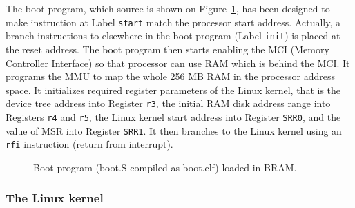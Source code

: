 The boot program, which source is shown on Figure~\ref{fig:boot}, has been designed to make instruction at Label \texttt{start} match the processor start address.
Actually, a branch instructions to elsewhere in the boot program (Label \texttt{init}) is placed at the reset address.
The boot program then starts enabling the MCI (Memory Controller Interface) so that processor can use RAM which is behind the MCI.
It programs the MMU to map the whole 256 MB RAM in the processor address space.
It initializes required register parameters of the Linux kernel, that is the device tree address into Register \texttt{r3}, the initial RAM disk address range into Registers \texttt{r4} and \texttt{r5}, the Linux kernel start address into Register \texttt{SRR0}, and the value of MSR into Register \texttt{SRR1}.
It then branches to the Linux kernel using an \texttt{rfi} instruction (return from interrupt).

\begin{figure}[p]
	\begin{center}
		
	\end{center}
	\caption{Boot program (boot.S compiled as boot.elf) loaded in BRAM.}
	\label{fig:boot}
\end{figure}

\subsubsection{The Linux kernel}

